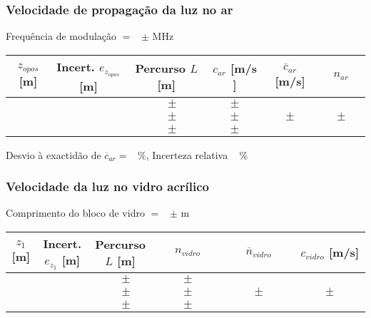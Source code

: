 \documentclass[a4paper,12pt]{article}  %
\begin{document}

\subsubsection{\sf Velocidade de propagação da luz no ar}

\noindent  Frequência de modulação $=$~\underline{\makebox[1cm][r]{~}} $\pm$ \underline{\makebox[1cm][r]{~}} MHz %

\begin{center}
	\begin{tabular}{|c|c|c|c|c|c|}
	\hline
	 $z_{opos}$  [m]   &  Incert. $e_{z_{opos}}$  [m] & Percurso $L$ [m] & \quad $c_{ar}$  [m/s \quad ]& \quad  $\overline{c}_{ar}$ [m/s]	\quad  &\quad\quad   $n_{ar}$ \quad\quad   \\
	\hline \hline
	  &  & $ \quad \pm $ & $ \quad \pm \quad $ &  & \\ \cline{1-4}
	  &  & $ \quad \pm $ & $ \quad \pm \quad$ & $ \quad \pm \quad$  & $ \quad \pm \quad$ \\ \cline{1-4}
	  &  & $ \quad \pm $ & $ \quad \pm \quad $ &  & \\ \hline
			\end{tabular}
\end{center}

\noindent Desvio à exactidão de $\overline{c}_{ar} =$~\underline{\makebox[1cm][r]{~}} \%, 
 Incerteza relativa  ~\underline{\makebox[1cm][r]{~}} \%


\newpage

\subsubsection{\sf Velocidade da luz no vidro acrílico}\label{sec:dados_ar}

\noindent Comprimento do bloco de vidro $=$~\underline{\makebox[1cm][r]{~}} $\pm$ \underline{\makebox[1cm][r]{~}} m  

\begin{center}
	\begin{tabular}{|c|c|c|c|c|c|}
	\hline
	 $z_{1}$  [m]   &  Incert. $e_{z_{1}}$  [m] & Percurso $L$ [m] & $n_{vidro}$  & $\overline{n}_{vidro}$ & $c_{vidro}$ [m/s]\\
	\hline \hline
	  &  & $ \quad \pm $ & $ \quad \pm \quad $ &  & \\ \cline{1-4}
	  &  & $ \quad \pm $ & $ \quad\quad \pm \quad\quad$ & $ \quad\quad \pm \quad\quad$  & $ \quad\quad \pm \quad\quad$ \\ \cline{1-4}
	  &  & $ \quad \pm $ & $ \quad \pm \quad $ &  & \\ \hline
			\end{tabular}
\end{center}
\end{document}
